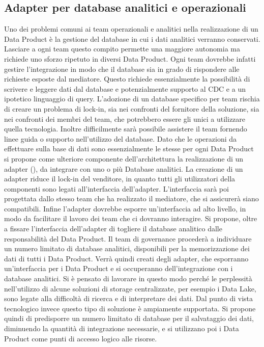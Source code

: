 \documentclass[a4paper,12pt]{report}
\begin{document}
\subsection{Adapter per database analitici e operazionali}
Uno dei problemi comuni ai team operazionali e analitici nella realizzazione di un Data Product è la gestione del database in cui i dati analitici verranno conservati.
Lasciare a ogni team questo compito permette una maggiore autonomia ma richiede uno sforzo ripetuto in diversi Data Product.
Ogni team dovrebbe infatti gestire l'integrazione in modo che il database sia in grado di rispondere alle richieste esposte dal mediatore.
Questo richiede essenzialmente la possibilità di scrivere e leggere dati dal database e potenzialmente supporto al CDC e a un ipotetico linguaggio di query.
L'adozione di un database specifico per team rischia di creare un problema di lock-in, sia nei confronti del fornitore della soluzione, sia nei confronti dei membri del team, che potrebbero essere gli unici a utilizzare quella tecnologia.
Inoltre difficilmente sarà possibile assistere il team fornendo linee guida o supporto nell'utilizzo del database.
Dato che le operazioni da effettuare sulla base di dati sono essenzialmente le stesse per ogni Data Product si propone come ulteriore componente dell'architettura la realizzazione di un adapter (\cite{designPatterns}), da integrare con uno o più Database analitici.
La creazione di un adapter riduce il lock-in del venditore, in quanto tutti gli utilizzatori della componenti sono legati all'interfaccia dell'adapter.
L'interfaccia sarà poi progettata dallo stesso team che ha realizzato il mediatore, che si assicurerà siano compatibili.
Infine l'adapter dovrebbe esporre un'interfaccia ad alto livello, in modo da facilitare il lavoro dei team che ci dovranno interagire.
Si propone, oltre a fissare l'interfaccia dell'adapter di togliere il database analitico dalle responsabilità del Data Product.
Il team di governance procederà a individuare un numero limitato di database analitici, disponibili per la memorizzazione dei dati di tutti i Data Product.
Verrà quindi creati degli adapter, che esporranno un'interfaccia per i Data Product e si occuperanno dell'integrazione con i database analitici.
Si è pensato di lavorare in questo modo perché le perplessità nell'utilizzo di alcune soluzioni di storage centralizzate, per esempio i Data Lake, sono legate alla difficoltà di ricerca e di interpretare dei dati. 
Dal punto di vista tecnologico invece questo tipo di soluzione è ampiamente supportata.
Si propone quindi di predisporre un numero limitato di database per il salvataggio dei dati, diminuendo la quantità di integrazione necessarie, e si utilizzano poi i Data Product come punti di accesso logico alle risorse.
\end{document}
